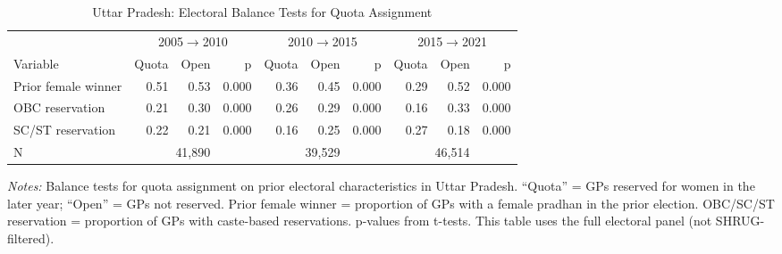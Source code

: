\begin{table}[htbp]
\caption{Uttar Pradesh: Electoral Balance Tests for Quota Assignment}
\label{tab:balance_electoral_up}
{\centering\scriptsize
\begin{tabular}{@{}lrrr rrr rrr@{}}
\toprule
& \multicolumn{3}{c}{2005$\rightarrow$2010} & \multicolumn{3}{c}{2010$\rightarrow$2015} & \multicolumn{3}{c}{2015$\rightarrow$2021} \\
\cmidrule(lr){2-4} \cmidrule(lr){5-7} \cmidrule(lr){8-10}
Variable & Quota & Open & p & Quota & Open & p & Quota & Open & p \\
\midrule
Prior female winner & 0.51 & 0.53 & 0.000 & 0.36 & 0.45 & 0.000 & 0.29 & 0.52 & 0.000 \\
OBC reservation & 0.21 & 0.30 & 0.000 & 0.26 & 0.29 & 0.000 & 0.16 & 0.33 & 0.000 \\
SC/ST reservation & 0.22 & 0.21 & 0.000 & 0.16 & 0.25 & 0.000 & 0.27 & 0.18 & 0.000 \\
\midrule
N & \multicolumn{3}{c}{41,890} & \multicolumn{3}{c}{39,529} & \multicolumn{3}{c}{46,514} \\
\bottomrule
\end{tabular}
\par}

\vspace{0.5ex}
\parbox{\linewidth}{\scriptsize \emph{Notes:} Balance tests for quota assignment on prior electoral characteristics in Uttar Pradesh. ``Quota'' = GPs reserved for women in the later year; ``Open'' = GPs not reserved. Prior female winner = proportion of GPs with a female pradhan in the prior election. OBC/SC/ST reservation = proportion of GPs with caste-based reservations. p-values from t-tests. This table uses the full electoral panel (not SHRUG-filtered).}
\end{table}
